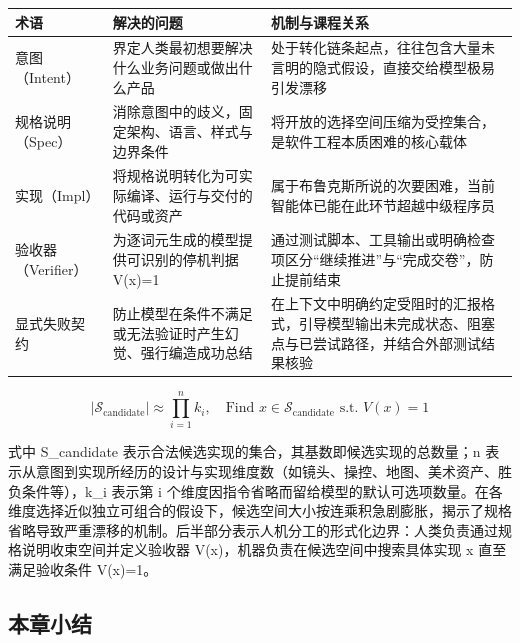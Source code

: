 \documentclass[UTF8,a4paper,11pt,fontset=fandol]{ctexart}
\begin{document}
\begin{center}\small\begin{tabularx}{\linewidth}{YYY}

\toprule

术语 & 解决的问题 & 机制与课程关系\\\midrule

意图（Intent） & 界定人类最初想要解决什么业务问题或做出什么产品 & 处于转化链条起点，往往包含大量未言明的隐式假设，直接交给模型极易引发漂移\\[3pt]

规格说明（Spec） & 消除意图中的歧义，固定架构、语言、样式与边界条件 & 将开放的选择空间压缩为受控集合，是软件工程本质困难的核心载体\\[3pt]

实现（Impl） & 将规格说明转化为可实际编译、运行与交付的代码或资产 & 属于布鲁克斯所说的次要困难，当前智能体已能在此环节超越中级程序员\\[3pt]

验收器（Verifier） & 为逐词元生成的模型提供可识别的停机判据 V(x)=1 & 通过测试脚本、工具输出或明确检查项区分“继续推进”与“完成交卷”，防止提前结束\\[3pt]

显式失败契约 & 防止模型在条件不满足或无法验证时产生幻觉、强行编造成功总结 & 在上下文中明确约定受阻时的汇报格式，引导模型输出未完成状态、阻塞点与已尝试路径，并结合外部测试结果核验\\[3pt]

\bottomrule\end{tabularx}\end{center}

\[
|\mathcal{S}_{\text{candidate}}| \approx \prod_{i=1}^{n} k_i,\quad \text{Find } x \in \mathcal{S}_{\text{candidate}} \text{ s.t. } V(x) = 1
\]

式中 S\_candidate 表示合法候选实现的集合，其基数即候选实现的总数量；n 表示从意图到实现所经历的设计与实现维度数（如镜头、操控、地图、美术资产、胜负条件等），k\_i 表示第 i 个维度因指令省略而留给模型的默认可选项数量。在各维度选择近似独立可组合的假设下，候选空间大小按连乘积急剧膨胀，揭示了规格省略导致严重漂移的机制。后半部分表示人机分工的形式化边界：人类负责通过规格说明收束空间并定义验收器 V(x)，机器负责在候选空间中搜索具体实现 x 直至满足验收条件 V(x)=1。

\subsection{本章小结}
\end{document}
